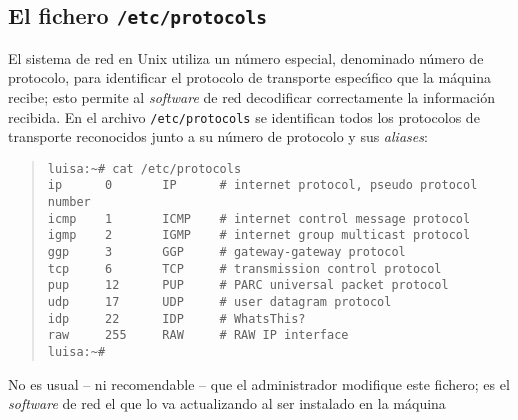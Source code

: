 \subsection{El fichero {\tt /etc/protocols}}
El sistema de red en Unix utiliza un n\'umero especial, denominado n\'umero de
protocolo, para identificar el protocolo de transporte espec\'{\i}fico que la
m\'aquina recibe; esto permite al {\it software} de red decodificar 
correctamente la informaci\'on recibida. En el archivo {\tt /etc/protocols}
se identifican todos los protocolos de transporte reconocidos junto a su 
n\'umero de protocolo y sus {\it aliases}:
\begin{quote}
\begin{verbatim}
luisa:~# cat /etc/protocols
ip      0       IP      # internet protocol, pseudo protocol number
icmp    1       ICMP    # internet control message protocol
igmp    2       IGMP    # internet group multicast protocol
ggp     3       GGP     # gateway-gateway protocol
tcp     6       TCP     # transmission control protocol
pup     12      PUP     # PARC universal packet protocol
udp     17      UDP     # user datagram protocol
idp     22      IDP     # WhatsThis?
raw     255     RAW     # RAW IP interface
luisa:~#
\end{verbatim}
\end{quote}
No es usual -- ni recomendable -- que el administrador modifique este fichero;
es el {\it software} de red el que lo va actualizando al ser instalado en la
m\'aquina
